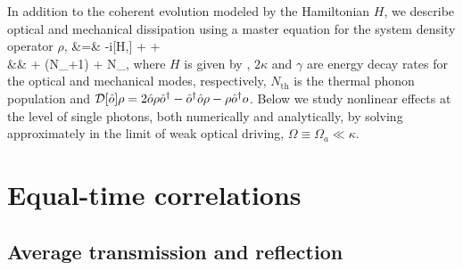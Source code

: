 In addition to the coherent evolution modeled  by the
Hamiltonian $H$, we describe optical and mechanical dissipation
using a master equation for the system density
operator $\rho$,
\bal
\label{eq:master_equation}
	\dot \rho &=& -i[H,\rho] + \kappa \DD[c_a]\rho +
	\kappa \DD[c_s]\rho \\
	&& \qquad + (N_{}+1) \DD[b]\rho +
	N_{}\DD[b\+]\rho,
\eal
where $H$ is  given by , $2\kappa$ and $\gamma$ are
energy decay rates for the optical and mechanical modes, respectively,
$N_{\mathrm{th}}$ is the thermal phonon population and  $\mathcal{D}[\hat o] \rho =
2\hat o \rho \hat o^\dagger - \hat o^\dagger \hat o \rho - \rho \hat o^\dagger o$.
Below we study nonlinear effects at the level
of single photons, both numerically and analytically,
by solving 
approximately in the limit of weak
optical driving, $\Omega \equiv \Omega_a\ll
\kappa$.


\section{Equal-time correlations}
\label{sect:Averages}

 
\subsection{Average transmission and reflection}


